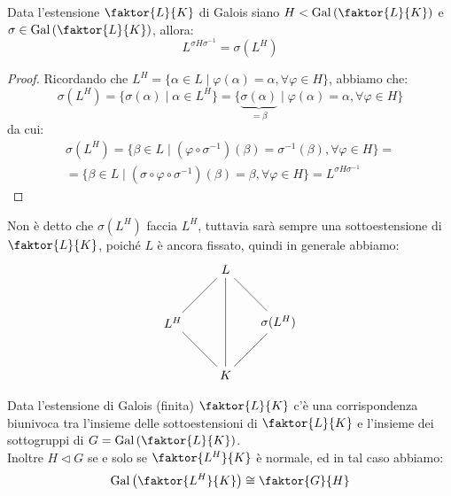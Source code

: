 \documentclass[11pt]{scrartcl}
\begin{document}
\begin{lemma}
    \label{3.68}
    Data l'estensione $\faktor{L}{K}$ di Galois siano $H < \Gal\left(\faktor{L}{K}\right)$ e $\sigma \in \Gal\left(\faktor{L}{K}\right)$, allora:
    \[ L^{\sigma H \sigma^{-1}} = \sigma(L^H)
        \]
\end{lemma}

\begin{proof}
    Ricordando che $L^H = \{\alpha \in L \mid \varphi(\alpha) = \alpha, \forall \varphi \in H\}$, abbiamo che:
    \[ \sigma(L^H) = \{\sigma(\alpha) \mid \alpha \in L^H\} = \{\underbrace{\sigma(\alpha)}_{= \beta} \mid \varphi(\alpha) = \alpha, \forall \varphi \in H\}
        \]
    da cui:
    \begin{multline*}
        \sigma(L^H) = \{\beta \in L \mid (\varphi \circ \sigma^{-1})(\beta) = \sigma^{-1}(\beta), \forall \varphi \in H\} = \\ 
        = \{\beta \in L \mid (\sigma \circ \varphi \circ \sigma^{-1})(\beta) = \beta, \forall \varphi \in H\} = L^{\sigma H \sigma^{-1}}
    \end{multline*}
\end{proof}

\begin{remark}
    Non è detto che $\sigma(L^H)$ faccia $L^H$, tuttavia sarà sempre una sottoestensione di $\faktor{L}{K}$, poiché $L$ è ancora fissato,
    quindi in generale abbiamo:
    \[\begin{tikzpicture}
        \node (Q1) at (0,0) {$K$};
        \node (Q2) at (1.5,1.5) {$\sigma(L^H)$};
        \node (Q3) at (0,3) {$L$};
        \node (Q4) at (-1.5,1.5) {$L^H$};
        \draw (Q1)--(Q2) node [pos=0.7, below,inner sep=0.25cm] {};
        \draw (Q1)--(Q4) node [pos=0.7, below,inner sep=0.25cm] {};
        \draw (Q3)--(Q4) node [pos=0.7, above] {};
        \draw (Q2)--(Q3) node [pos=0.3, above] {};
        \draw (Q1)--(Q3) node [pos=0.7, below, right,inner sep=0.25cm, yshift=-0.4cm] {};
        \end{tikzpicture}
        \] 
\end{remark}

\begin{theorem}
    \label{corrG}
    Data l'estensione di Galois (finita) $\faktor{L}{K}$ c'è una corrispondenza biunivoca tra l'insieme delle sottoestensioni di $\faktor{L}{K}$ e l'insieme dei sottogruppi di $G = \Gal\left(\faktor{L}{K}\right)$. \\
    Inoltre $H \triangleleft G$ se e solo se $\faktor{L^H}{K}$ è normale, ed in tal caso abbiamo:
    \[ \Gal\left(\faktor{L^H}{K}\right) \cong \faktor{G}{H}
        \]
\end{theorem}
\end{document}
